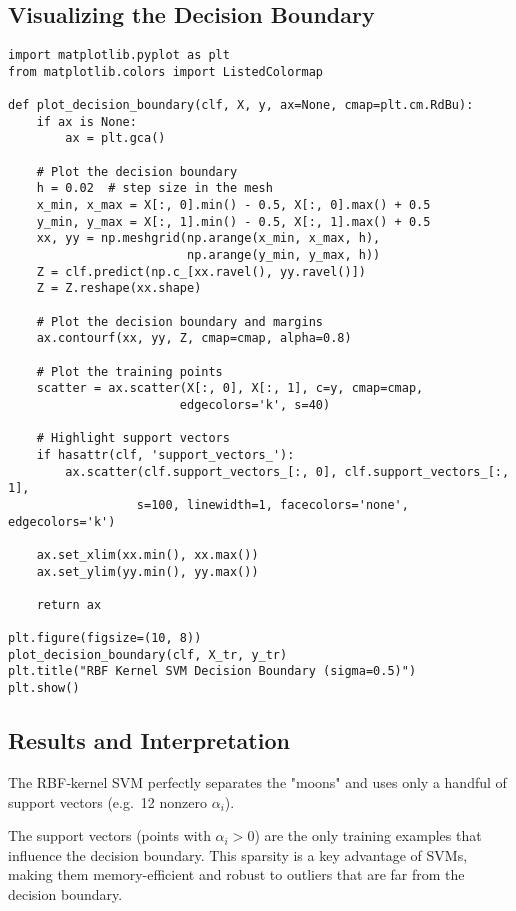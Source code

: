 \documentclass[11pt]{article}
\newenvironment{insight}
  {\begin{tcolorbox}[colback=blue!5!white,colframe=blue!75!black,title=Key Insight]}
  {\end{tcolorbox}}
\begin{document}
\subsection{Visualizing the Decision Boundary}
\begin{lstlisting}
import matplotlib.pyplot as plt
from matplotlib.colors import ListedColormap

def plot_decision_boundary(clf, X, y, ax=None, cmap=plt.cm.RdBu):
    if ax is None:
        ax = plt.gca()
    
    # Plot the decision boundary
    h = 0.02  # step size in the mesh
    x_min, x_max = X[:, 0].min() - 0.5, X[:, 0].max() + 0.5
    y_min, y_max = X[:, 1].min() - 0.5, X[:, 1].max() + 0.5
    xx, yy = np.meshgrid(np.arange(x_min, x_max, h),
                         np.arange(y_min, y_max, h))
    Z = clf.predict(np.c_[xx.ravel(), yy.ravel()])
    Z = Z.reshape(xx.shape)
    
    # Plot the decision boundary and margins
    ax.contourf(xx, yy, Z, cmap=cmap, alpha=0.8)
    
    # Plot the training points
    scatter = ax.scatter(X[:, 0], X[:, 1], c=y, cmap=cmap, 
                        edgecolors='k', s=40)
    
    # Highlight support vectors
    if hasattr(clf, 'support_vectors_'):
        ax.scatter(clf.support_vectors_[:, 0], clf.support_vectors_[:, 1],
                  s=100, linewidth=1, facecolors='none', edgecolors='k')
    
    ax.set_xlim(xx.min(), xx.max())
    ax.set_ylim(yy.min(), yy.max())
    
    return ax

plt.figure(figsize=(10, 8))
plot_decision_boundary(clf, X_tr, y_tr)
plt.title("RBF Kernel SVM Decision Boundary (sigma=0.5)")
plt.show()
\end{lstlisting}

\subsection{Results and Interpretation}
The RBF‐kernel SVM perfectly separates the "moons" and uses only a handful of support vectors (e.g.\ 12 nonzero $\alpha_i$).

\begin{insight}
The support vectors (points with $\alpha_i > 0$) are the only training examples that influence the decision boundary. This sparsity is a key advantage of SVMs, making them memory-efficient and robust to outliers that are far from the decision boundary.
\end{insight}
\end{document}
